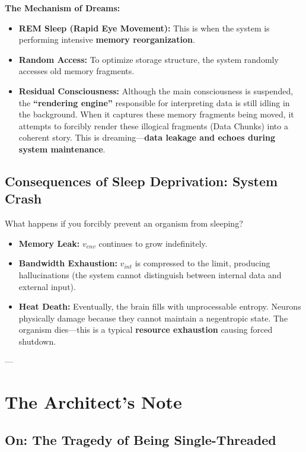 \documentclass[11pt,a4paper,twoside]{book}
\begin{document}
\textbf{The Mechanism of Dreams:}

\begin{itemize}
\item \textbf{REM Sleep (Rapid Eye Movement):} This is when the system is performing intensive \textbf{memory reorganization}.

\item \textbf{Random Access:} To optimize storage structure, the system randomly accesses old memory fragments.

\item \textbf{Residual Consciousness:} Although the main consciousness is suspended, the \textbf{``rendering engine''} responsible for interpreting data is still idling in the background. When it captures these memory fragments being moved, it attempts to forcibly render these illogical fragments (Data Chunks) into a coherent story. This is dreaming---\textbf{data leakage and echoes during system maintenance}.
\end{itemize}

\subsection{Consequences of Sleep Deprivation: System Crash}

What happens if you forcibly prevent an organism from sleeping?

\begin{itemize}
\item \textbf{Memory Leak:} \textbf{$v_{env}$} continues to grow indefinitely.

\item \textbf{Bandwidth Exhaustion:} \textbf{$v_{int}$} is compressed to the limit, producing hallucinations (the system cannot distinguish between internal data and external input).

\item \textbf{Heat Death:} Eventually, the brain fills with unprocessable entropy. Neurons physically damage because they cannot maintain a negentropic state. The organism dies---this is a typical \textbf{resource exhaustion} causing forced shutdown.
\end{itemize}

---

\section{The Architect's Note}

\subsection{On: The Tragedy of Being Single-Threaded}
\end{document}
